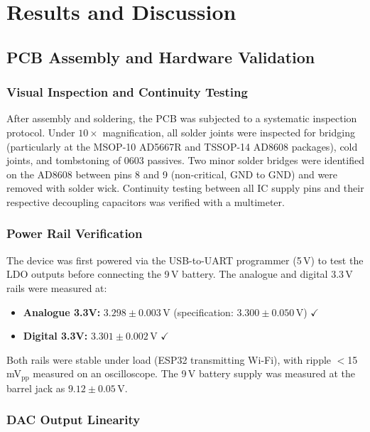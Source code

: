 \chapter{Results and Discussion}
\label{ch:results}

\section{PCB Assembly and Hardware Validation}
\label{sec:pcb_validation}

\subsection{Visual Inspection and Continuity Testing}

After assembly and soldering, the PCB was subjected to a systematic inspection protocol. Under $10\times$ magnification, all solder joints were inspected for bridging (particularly at the MSOP-10 AD5667R and TSSOP-14 AD8608 packages), cold joints, and tombstoning of 0603 passives. Two minor solder bridges were identified on the AD8608 between pins 8 and 9 (non-critical, GND to GND) and were removed with solder wick. Continuity testing between all IC supply pins and their respective decoupling capacitors was verified with a multimeter.

\subsection{Power Rail Verification}

The device was first powered via the USB-to-UART programmer (5\,V) to test the LDO outputs before connecting the 9\,V battery. The analogue and digital 3.3\,V rails were measured at:
\begin{itemize}
    \item \textbf{Analogue 3.3V:} $3.298 \pm 0.003$\,V (specification: $3.300 \pm 0.050$\,V) $\checkmark$
    \item \textbf{Digital 3.3V:} $3.301 \pm 0.002$\,V $\checkmark$
\end{itemize}
Both rails were stable under load (ESP32 transmitting Wi-Fi), with ripple $<$15\,mV$_{\text{pp}}$ measured on an oscilloscope. The 9\,V battery supply was measured at the barrel jack as $9.12 \pm 0.05$\,V.

\subsection{DAC Output Linearity}

